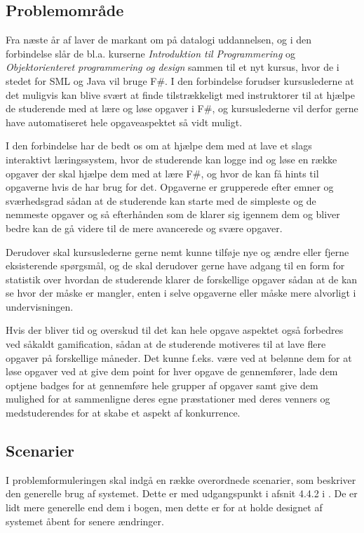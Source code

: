 \documentclass[12pt]{article}
\begin{document}
\subsection{Problemområde}
Fra næste år af laver de markant om på datalogi uddannelsen, og i den forbindelse slår de bl.a. kurserne \emph{Introduktion til Programmering} og \emph{Objektorienteret programmering og design} sammen til et nyt kursus, hvor de i stedet for SML og Java vil bruge F\#.
I den forbindelse forudser kursuslederne at det muligvis kan blive svært at finde tilstrækkeligt med instruktorer til at hjælpe de studerende med at lære og løse opgaver i F\#, og kursuslederne vil derfor gerne have automatiseret hele opgaveaspektet så vidt muligt.

I den forbindelse har de bedt os om at hjælpe dem med at lave et slags interaktivt læringssystem, hvor de studerende kan logge ind og løse en række opgaver der skal hjælpe dem med at lære F\#, og hvor de kan få hints til opgaverne hvis de har brug for det. Opgaverne er grupperede efter emner og sværhedsgrad sådan at de studerende kan starte med de simpleste og de nemmeste opgaver og så efterhånden som de klarer sig igennem dem og bliver bedre kan de gå videre til de mere avancerede og svære opgaver.

Derudover skal kursuslederne gerne nemt kunne tilføje nye og ændre eller fjerne eksisterende spørgsmål, og de skal derudover gerne have adgang til en form for statistik over hvordan de studerende klarer de forskellige opgaver sådan at de kan se hvor der måske er mangler, enten i selve opgaverne eller måske mere alvorligt i undervisningen.

Hvis der bliver tid og overskud til det kan hele opgave aspektet også forbedres ved såkaldt gamification, sådan at de studerende motiveres til at lave flere opgaver på forskellige måneder. Det kunne f.eks. være ved at belønne dem for at løse opgaver ved at give dem point for hver opgave de gennemfører, lade dem optjene badges for at gennemføre hele grupper af opgaver samt give dem mulighed for at sammenligne deres egne præstationer med deres venners og medstuderendes for at skabe et aspekt af konkurrence.


\subsection{Scenarier}
I problemformuleringen skal indgå en række overordnede scenarier, som beskriver den generelle brug af systemet. Dette er med udgangspunkt i afsnit 4.4.2 i \cite{OOSE}. De er lidt mere generelle end dem i bogen, men dette er for at holde designet af systemet åbent for senere ændringer.
\end{document}
